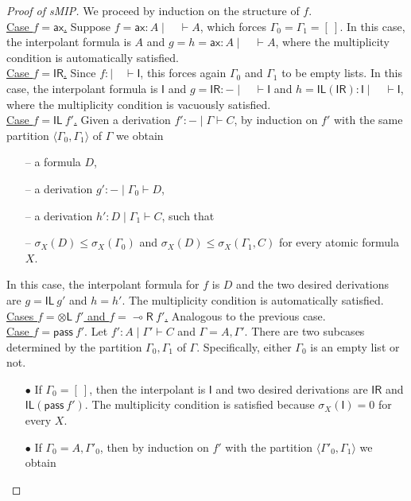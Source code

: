 \documentclass[sn-mathphys-num]{sn-jnl}%
\newcommand{\GG}{\Gamma}
\newcommand{\vd}{\vdash}
\newcommand{\tl}{\otimes \mathsf{L}}
\newcommand{\pass}{\mathsf{pass}}
\newcommand{\unitl}{\mathsf{IL}}
\newcommand{\unitr}{\mathsf{IR}}
\newcommand{\ax}{\mathsf{ax}}
\newcommand{\lolli}{\multimap}
\newcommand{\lright}{{\lolli}\mathsf{R}}
\newcommand{\unit}{\mathsf{I}}
\newcommand{\gs}[1]{\sigma_{X} (#1)}
\newcommand{\sMIP}{\textsf{sMIP}}
\theoremstyle{thmstyleone}%
\theoremstyle{thmstyletwo}%
\theoremstyle{thmstylethree}%
\begin{document}
\begin{proof}[Proof of \sMIP]
We proceed by induction on the structure of $f$. 
\\
\underline{Case $f = \ax$.} Suppose $f = \ax : A \mid \quad \vd A$, which forces $\GG_0 = \GG_1 = [\ ]$.
In this case, the interpolant formula is $A$ and $g = h = \ax : A \mid \quad \vd A$, where the multiplicity condition is automatically satisfied.
\\
\underline{Case $f = \unitr$.} Since $f : \mid \quad \vd \unit$, this forces again $\GG_0$ and $\GG_1$ to be empty lists.
In this case, the interpolant formula is $\unit$ and $g =  \unitr : {-} \mid \quad \vd \unit$ and $h = \unitl (\unitr) : \unit \mid \quad \vd \unit$, where the multiplicity condition is vacuously satisfied.
\\
\underline{Case $f = \unitl \ f'$.}
Given a derivation $f' : {-} \mid \GG \vd C$, by induction on $f'$ with the same partition $\langle \GG_0, \GG_1 \rangle$ of $\GG$ we obtain  
\begin{itemize}
  \item[--] a formula $D$,
  \item[--] a derivation $g' : {-} \mid \GG_0 \vd D$,
  \item[--] a derivation $h' : D \mid \GG_1 \vd C$, such that
  \item[--] $\gs{D} \leq \gs{\GG_0}$ and $\gs{D} \leq \gs{\GG_1 , C}$ for every atomic formula $X$.
\end{itemize}
In this case, the interpolant formula for $f$ is $D$ and the two desired derivations are $g = \unitl \ g'$ and $h = h'$.
The multiplicity condition is automatically satisfied.
\\
\underline{Cases $f = \tl \ f'$ and $f = \lright \ f'$.} Analogous to the previous case.
\\
\underline{Case $f = \pass \ f'$}. Let $f' : A \mid \Gamma' \vd C$ and $\Gamma = A,\Gamma'$.
There are two subcases determined by the partition $\GG_0,\GG_1$ of $\GG$. 
Specifically, either $\GG_0$ is an empty list or not.
\begin{itemize}
  \item[$\bullet$] If $\GG_0 = [\ ]$, then the interpolant is $\unit$ and two desired derivations are $\unitr$ and $\unitl (\pass \ f')$.
The multiplicity condition is satisfied because $\gs{\unit} = 0$ for every $X$.
  \item[$\bullet$] If $\GG_0 = A, \GG'_0$, then by induction on $f'$ with the partition $\langle \GG'_0, \GG_1 \rangle$ we obtain
\begin{itemize}

\end{itemize}
\end{itemize}
\end{proof}
\end{document}
